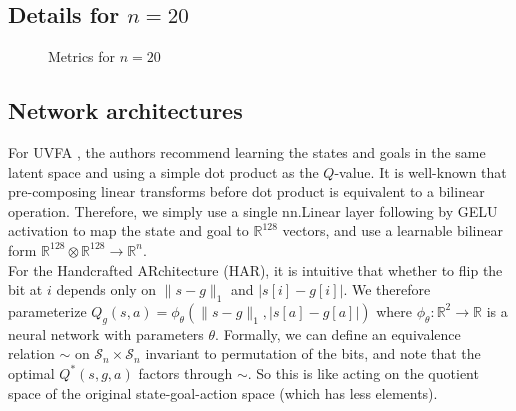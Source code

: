 \documentclass{article}
\begin{document}
\subsection{Details for $n=20$}
\begin{figure}[H]\label{figure}
  \centering
  \caption{Metrics for $n=20$}
\end{figure}
\subsection{Network architectures}
For UVFA \cite{UVFA}, the authors recommend learning the states and goals in the same latent space and using a simple dot product as the $Q$-value. It is well-known that pre-composing linear transforms before dot product is equivalent to a bilinear operation. Therefore, we simply use a single nn.Linear layer following by GELU activation to map the state and goal to $\mathbb{R}^{128}$ vectors, and use a learnable bilinear form $\mathbb{R}^{128} \otimes \mathbb{R}^{128} \rightarrow \mathbb{R}^n$. \\

For the Handcrafted ARchitecture (HAR), it is intuitive that whether to flip the bit at $i$ depends only on $\|s-g\|_1$ and $|s[i]-g[i]|$. We therefore parameterize $Q_g(s,a)=\phi_\theta(\|s-g\|_1,|s[a]-g[a]|)$ where $\phi_\theta: \mathbb{R}^2 \rightarrow \mathbb{R}$ is a neural network with parameters $\theta$. Formally, we can define an equivalence relation $\sim$ on $\mathcal{S}_n \times \mathcal{S}_n$ invariant to permutation of the bits, and note that the optimal $Q^*(s,g,a)$ factors through $\sim$. So this is like acting on the quotient space of the original state-goal-action space (which has less elements). 
\end{document}
